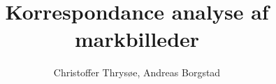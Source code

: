 \documentclass[11pt,a4paper,oldfontcommands,twosided,article]{memoir}
\title{Korrespondance analyse af markbilleder}
\author{Christoffer Thrysøe, Andreas Borgstad}
\date{} %
\begin{document}
\maketitle %
\newpage
\renewcommand{\contentsname}{Indholdsfortegnelse}
\setcounter{secnumdepth}{3}
\setcounter{tocdepth}{1}
\tableofcontents*
\newpage
{}

\newpage

\newpage

\newpage

\newpage%

\newpage

\newpage

\nocite{}

\newpage
\appendix
\def\@chapapp{Appendix}

\end{document}
